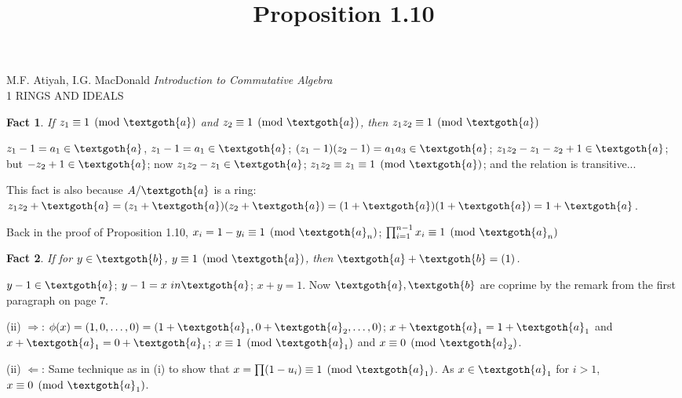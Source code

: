 \documentclass{article}
\title{Proposition 1.10}
\newtheorem*{fact}{Fact}
\begin{document}
\maketitle

\begin{center}
M.F. Atiyah, I.G. MacDonald \emph{Introduction to Commutative Algebra} \\
1 RINGS AND IDEALS
\end{center}

\vspace*{10px} 

\begin{fact}
If $z_1 \equiv 1 \pmod{\textgoth{a}}$ and $z_2 \equiv 1 \pmod{\textgoth{a}}$, then $z_1 z_2 \equiv 1 \pmod{\textgoth{a}}$ 
\end{fact}

$z_1 - 1 = a_1 \in \textgoth{a}$, $z_1 - 1 = a_1 \in \textgoth{a}$; $(z_1 - 1)(z_2 - 1) = a_1 a_3 \in \textgoth{a}$; $z_1 z_2 - z_1 - z_2 + 1 \in \textgoth{a}$; but $- z_2 + 1 \in \textgoth{a}$; now $z_1 z_2 - z_1 \in \textgoth{a}$; $z_1 z_2 \equiv z_1 \equiv 1 \pmod{\textgoth{a}}$; and the relation is transitive...

This fact is also because $A / \textgoth{a}$ is a ring: $z_1 z_2 + \textgoth{a} = (z_1 + \textgoth{a})(z_2 + \textgoth{a}) = (1 + \textgoth{a})(1 + \textgoth{a}) = 1 + \textgoth{a}$.

\vspace*{10px} 

Back in the proof of Proposition 1.10, $x_i = 1 - y_i \equiv 1 \pmod{\textgoth{a}_n}$; $\prod_{i = 1}^{n-1} x_i \equiv 1 \pmod{\textgoth{a}_n}$

\vspace*{10px} 

\begin{fact}
If for $y \in \textgoth{b}$, $y \equiv 1 \pmod{\textgoth{a}}$, then $\textgoth{a} + \textgoth{b} = (1)$.
\end{fact}

$y - 1 \in \textgoth{a}$; $y - 1 = x \ in \textgoth{a}$; $x + y = 1$. Now $\textgoth{a}, \textgoth{b}$ are coprime by the remark from the first paragraph on page 7.

\vspace*{10px} 

(ii) $\Rightarrow$: $\phi(x) = (1, 0, \dots, 0) = (1 + \textgoth{a}_1, 0 + \textgoth{a}_2, \dots, 0)$; $x + \textgoth{a}_1 = 1 + \textgoth{a}_1$ and $x + \textgoth{a}_1 = 0 + \textgoth{a}_1$; $x \equiv 1 \pmod{\textgoth{a}_1}$ and $x \equiv 0 \pmod{\textgoth{a}_2}$.

(ii) $\Leftarrow$: Same technique as in (i) to show that $x = \prod (1 - u_i) \equiv 1 \pmod{\textgoth{a}_1}$. As $x \in \textgoth{a}_1$ for $i > 1$, $x \equiv 0 \pmod{\textgoth{a}_1}$.
\end{document}

